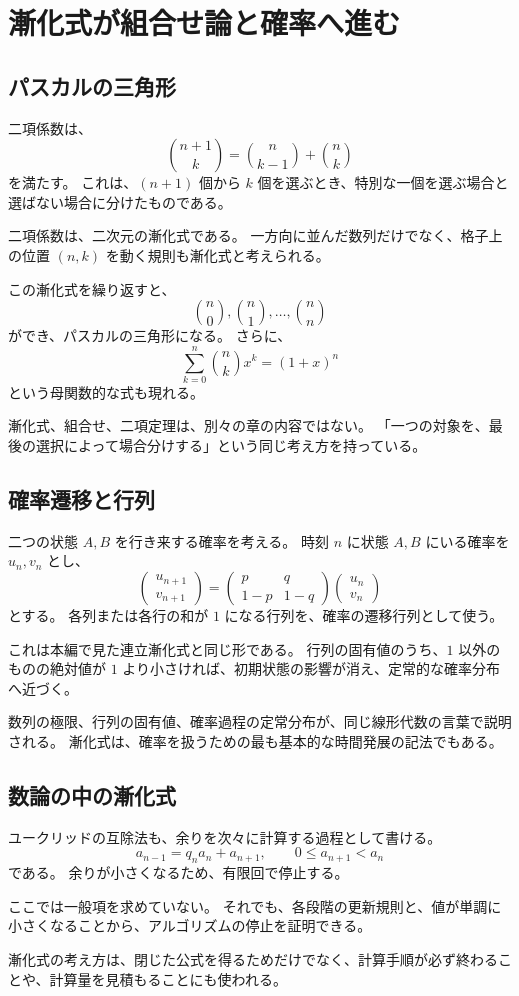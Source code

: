 
\section{漸化式が組合せ論と確率へ進む}

\subsection{パスカルの三角形}

二項係数は、
\[
  \binom{n+1}{k}
  =
  \binom{n}{k-1}+\binom{n}{k}
\]
を満たす。
これは、$(n+1)$ 個から $k$ 個を選ぶとき、特別な一個を選ぶ場合と選ばない場合に分けたものである。

二項係数は、二次元の漸化式である。
一方向に並んだ数列だけでなく、格子上の位置 $(n,k)$ を動く規則も漸化式と考えられる。

この漸化式を繰り返すと、
\[
  \binom{n}{0},\binom{n}{1},\ldots,\binom{n}{n}
\]
ができ、パスカルの三角形になる。
さらに、
\[
  \sum_{k=0}^{n}\binom{n}{k}x^k=(1+x)^n
\]
という母関数的な式も現れる。

漸化式、組合せ、二項定理は、別々の章の内容ではない。
「一つの対象を、最後の選択によって場合分けする」という同じ考え方を持っている。

\subsection{確率遷移と行列}

二つの状態 $A,B$ を行き来する確率を考える。
時刻 $n$ に状態 $A,B$ にいる確率を $u_n,v_n$ とし、
\[
  \begin{pmatrix}u_{n+1}\\v_{n+1}\end{pmatrix}
  =
  \begin{pmatrix}p&q\\1-p&1-q\end{pmatrix}
  \begin{pmatrix}u_n\\v_n\end{pmatrix}
\]
とする。
各列または各行の和が $1$ になる行列を、確率の遷移行列として使う。

これは本編で見た連立漸化式と同じ形である。
行列の固有値のうち、$1$ 以外のものの絶対値が $1$ より小さければ、初期状態の影響が消え、定常的な確率分布へ近づく。

数列の極限、行列の固有値、確率過程の定常分布が、同じ線形代数の言葉で説明される。
漸化式は、確率を扱うための最も基本的な時間発展の記法でもある。

\subsection{数論の中の漸化式}

ユークリッドの互除法も、余りを次々に計算する過程として書ける。
\[
  a_{n-1}=q_na_n+a_{n+1},
  \qquad 0\leq a_{n+1}<a_n
\]
である。
余りが小さくなるため、有限回で停止する。

ここでは一般項を求めていない。
それでも、各段階の更新規則と、値が単調に小さくなることから、アルゴリズムの停止を証明できる。

漸化式の考え方は、閉じた公式を得るためだけでなく、計算手順が必ず終わることや、計算量を見積もることにも使われる。
